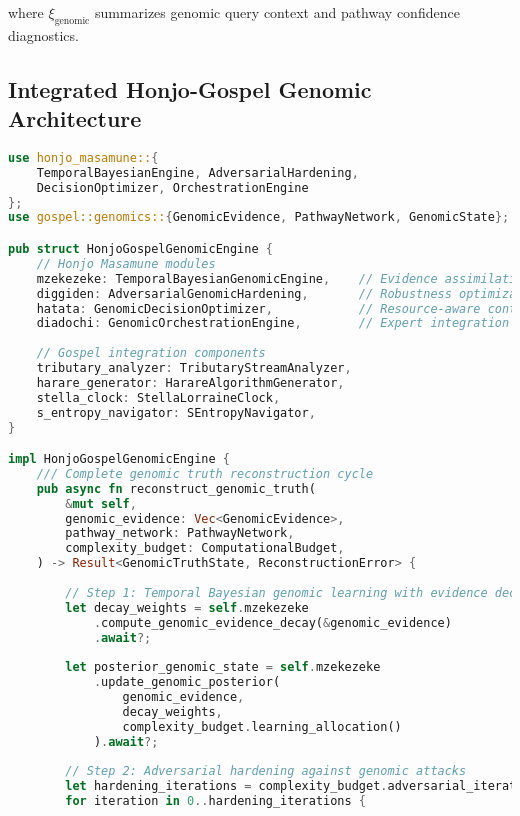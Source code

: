 \documentclass[12pt,a4paper]{article}
\begin{document}
where $\xi_{\text{genomic}}$ summarizes genomic query context and pathway confidence diagnostics.

\subsection{Integrated Honjo-Gospel Genomic Architecture}

\begin{lstlisting}[language=Rust, caption=Honjo Masamune Genomic Truth Engine Integration]
use honjo_masamune::{
    TemporalBayesianEngine, AdversarialHardening, 
    DecisionOptimizer, OrchestrationEngine
};
use gospel::genomics::{GenomicEvidence, PathwayNetwork, GenomicState};

pub struct HonjoGospelGenomicEngine {
    // Honjo Masamune modules
    mzekezeke: TemporalBayesianGenomicEngine,    // Evidence assimilation
    diggiden: AdversarialGenomicHardening,       // Robustness optimization  
    hatata: GenomicDecisionOptimizer,            // Resource-aware control
    diadochi: GenomicOrchestrationEngine,        // Expert integration
    
    // Gospel integration components
    tributary_analyzer: TributaryStreamAnalyzer,
    harare_generator: HarareAlgorithmGenerator,
    stella_clock: StellaLorraineClock,
    s_entropy_navigator: SEntropyNavigator,
}

impl HonjoGospelGenomicEngine {
    /// Complete genomic truth reconstruction cycle
    pub async fn reconstruct_genomic_truth(
        &mut self,
        genomic_evidence: Vec<GenomicEvidence>,
        pathway_network: PathwayNetwork,
        complexity_budget: ComputationalBudget,
    ) -> Result<GenomicTruthState, ReconstructionError> {
        
        // Step 1: Temporal Bayesian genomic learning with evidence decay
        let decay_weights = self.mzekezeke
            .compute_genomic_evidence_decay(&genomic_evidence)
            .await?;
        
        let posterior_genomic_state = self.mzekezeke
            .update_genomic_posterior(
                genomic_evidence,
                decay_weights,
                complexity_budget.learning_allocation()
            ).await?;
        
        // Step 2: Adversarial hardening against genomic attacks
        let hardening_iterations = complexity_budget.adversarial_iterations();
        for iteration in 0..hardening_iterations {
            

\end{lstlisting}
\end{document}
